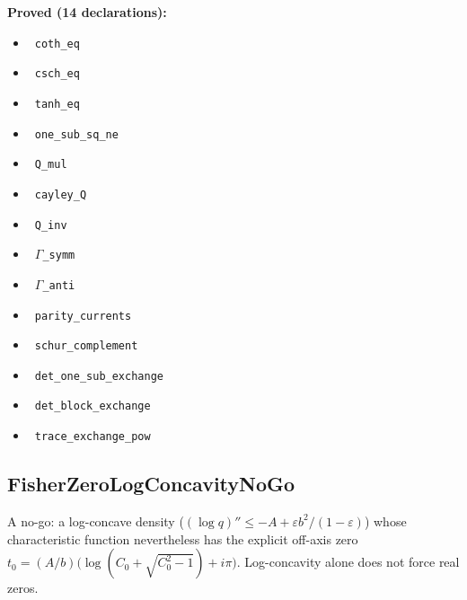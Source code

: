 \documentclass{report}
\theoremstyle{definition}
\begin{document}
\noindent\textbf{Proved (14 declarations):}
\begin{itemize}
  \item {}\leanok\ \texttt{coth\_eq}
  \item {}\leanok\ \texttt{csch\_eq}
  \item {}\leanok\ \texttt{tanh\_eq}
  \item {}\leanok\ \texttt{one\_sub\_sq\_ne}
  \item {}\leanok\ \texttt{Q\_mul}
  \item {}\leanok\ \texttt{cayley\_Q}
  \item {}\leanok\ \texttt{Q\_inv}
  \item {}\leanok\ \texttt{$\Gamma$\_symm}
  \item {}\leanok\ \texttt{$\Gamma$\_anti}
  \item {}\leanok\ \texttt{parity\_currents}
  \item {}\leanok\ \texttt{schur\_complement}
  \item {}\leanok\ \texttt{det\_one\_sub\_exchange}
  \item {}\leanok\ \texttt{det\_block\_exchange}
  \item {}\leanok\ \texttt{trace\_exchange\_pow}
\end{itemize}

\subsection{FisherZeroLogConcavityNoGo}
A no-go: a log-concave density ($(\log q)''\le -A+\varepsilon b^2/(1-\varepsilon)$) whose characteristic function nevertheless has the explicit off-axis zero $t_0=(A/b)\bigl(\log(C_0+\sqrt{C_0^2-1})+i\pi\bigr)$. Log-concavity alone does not force real zeros.
\end{document}
